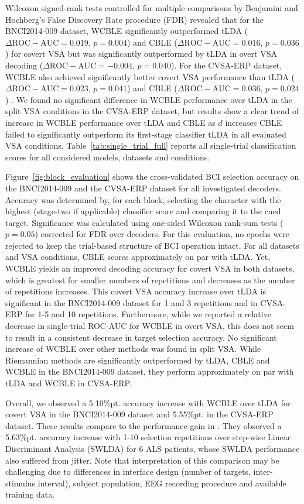 Wilcoxon signed-rank tests controlled for multiple comparisons by Benjamini
and Hochberg's False Discovery Rate procedure (FDR) revealed that
for the BNCI2014-009 dataset, WCBLE significantly outperformed tLDA
($\Delta\mathrm{ROC-AUC} = 0.019$, $p=0.004$) and CBLE
($\Delta\mathrm{ROC-AUC} = 0.016$, $p=0.036$) for covert VSA
but was significantly outperformed by tLDA in overt VSA decoding
($\Delta\mathrm{ROC-AUC}=-0.004$, $p=0.040$).
For the CVSA-ERP dataset, WCBLE
also achieved significantly better covert VSA performance than tLDA ($\Delta\mathrm{ROC-AUC}
	= 0.023$, $p=0.041$) and CBLE ($\Delta\mathrm{ROC-AUC}
	= 0.036$, $p=0.024$) .
We found no significant difference in WCBLE performance over tLDA in the split
VSA conditions in the CVSA-ERP dataset, but results show a clear trend of
increase in WCBLE performance over tLDA and CBLE as $d$ increases
CBLE failed to significantly outperform its first-stage classifier tLDA in all
evaluated VSA conditions.
Table~\ref{tab:single_trial_full} reports all single-trial classification scores for all considered models, datasets
and conditions.

Figure~\ref{fig:block_evaluation} shows the cross-validated BCI selection
accuracy on the BNCI2014-009 and the CVSA-ERP dataset for all investigated
decoders.
Accuracy was determined by, for each block, selecting the character with the
highest (stage-two if applicable) classifier score and comparing it to the cued target.
Significance was calculated using one-sided Wilcoxon rank-sum tests ($p=0.05$)
corrected for FDR over decoders.
For this evaluation, no epochs were rejected to keep the trial-based structure of BCI
operation intact.
For all datasets and VSA conditions, CBLE scores approximately on par with tLDA.
Yet, WCBLE yields an improved decoding accuracy for covert VSA in both
datasets, which is greatest for smaller numbers of repetitions and
decreases as the number of repetitions increases.
This covert VSA accuracy increase over tLDA is significant in the BNCI2014-009 dataset
for 1 and 3 repetitions and in CVSA-ERP for 1-5 and 10 repetitions.
Furthermore, while we reported a relative decrease in single-trial ROC-AUC for
WCBLE in overt VSA, this does not seem to result in a consistent decrease in target
selection accuracy.
No significant increase of WCBLE over other methods was found in split VSA.
While Riemannian methods are significantly outperformed by tLDA, CBLE and WCBLE
in the BNCI2014-009 dataset, they perform approximately on par with tLDA and
WCBLE in CVSA-ERP.

Overall, we observed a 5.10\%pt. accuracy increase with WCBLE over
tLDA for covert VSA in the BNCI2014-009 dataset and 5.55\%pt. in the CVSA-ERP dataset.
These results compare to the performance gain in \cite{Zisk2022}.
They observed a 5.63\%pt. accuracy increase with 1-10 selection repetitions over
step-wise Linear Discriminant Analysis  (SWLDA) for 6 ALS patients, whose SWLDA
performance also suffered from jitter.
Note that interpretation of this comparison may be challenging due to differences in
interface design (number of targets, inter-stimulus interval), subject population,
EEG recording procedure and available training data.


